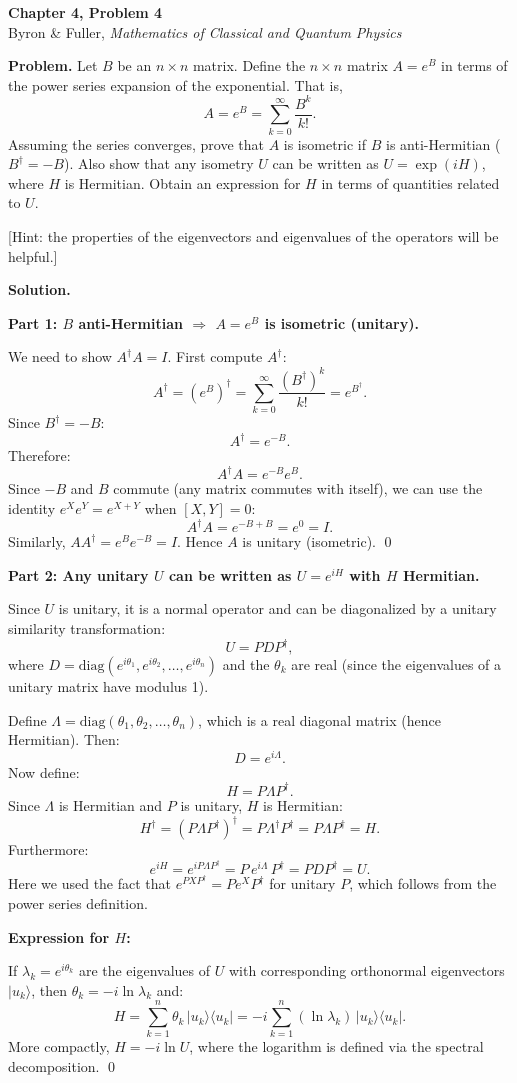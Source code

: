 \documentclass[12pt]{article}
\begin{document}
\begin{center}
{\Large\bfseries Chapter 4, Problem 4}\\[6pt]
Byron \& Fuller, \textit{Mathematics of Classical and Quantum Physics}
\end{center}

\bigskip

\textbf{Problem.} Let $B$ be an $n \times n$ matrix. Define the $n \times n$ matrix $A = e^B$ in terms of the power series expansion of the exponential. That is,
\[
A = e^B = \sum_{k=0}^{\infty} \frac{B^k}{k!}.
\]
Assuming the series converges, prove that $A$ is isometric if $B$ is anti-Hermitian ($B^\dagger = -B$). Also show that any isometry $U$ can be written as $U = \exp(iH)$, where $H$ is Hermitian. Obtain an expression for $H$ in terms of quantities related to $U$.

[Hint: the properties of the eigenvectors and eigenvalues of the operators will be helpful.]

\bigskip
\textbf{Solution.}

\textbf{Part 1: $B$ anti-Hermitian $\Rightarrow$ $A = e^B$ is isometric (unitary).}

We need to show $A^\dagger A = I$. First compute $A^\dagger$:
\[
A^\dagger = \left(e^B\right)^\dagger = \sum_{k=0}^{\infty} \frac{(B^\dagger)^k}{k!} = e^{B^\dagger}.
\]
Since $B^\dagger = -B$:
\[
A^\dagger = e^{-B}.
\]
Therefore:
\[
A^\dagger A = e^{-B} e^{B}.
\]
Since $-B$ and $B$ commute (any matrix commutes with itself), we can use the identity $e^X e^Y = e^{X+Y}$ when $[X,Y] = 0$:
\[
A^\dagger A = e^{-B+B} = e^0 = I.
\]
Similarly, $AA^\dagger = e^B e^{-B} = I$. Hence $A$ is unitary (isometric). \qed

\bigskip
\textbf{Part 2: Any unitary $U$ can be written as $U = e^{iH}$ with $H$ Hermitian.}

Since $U$ is unitary, it is a normal operator and can be diagonalized by a unitary similarity transformation:
\[
U = P D P^\dagger,
\]
where $D = \text{diag}(e^{i\theta_1}, e^{i\theta_2}, \ldots, e^{i\theta_n})$ and the $\theta_k$ are real (since the eigenvalues of a unitary matrix have modulus 1).

Define $\Lambda = \text{diag}(\theta_1, \theta_2, \ldots, \theta_n)$, which is a real diagonal matrix (hence Hermitian). Then:
\[
D = e^{i\Lambda}.
\]
Now define:
\[
H = P \Lambda P^\dagger.
\]
Since $\Lambda$ is Hermitian and $P$ is unitary, $H$ is Hermitian:
\[
H^\dagger = (P\Lambda P^\dagger)^\dagger = P \Lambda^\dagger P^\dagger = P \Lambda P^\dagger = H.
\]
Furthermore:
\[
e^{iH} = e^{iP\Lambda P^\dagger} = P\, e^{i\Lambda}\, P^\dagger = P D P^\dagger = U.
\]
Here we used the fact that $e^{P X P^\dagger} = P e^X P^\dagger$ for unitary $P$, which follows from the power series definition.

\bigskip
\textbf{Expression for $H$:}

If $\lambda_k = e^{i\theta_k}$ are the eigenvalues of $U$ with corresponding orthonormal eigenvectors $|u_k\rangle$, then $\theta_k = -i \ln \lambda_k$ and:
\[
H = \sum_{k=1}^n \theta_k\, |u_k\rangle\langle u_k| = -i \sum_{k=1}^n (\ln \lambda_k)\, |u_k\rangle\langle u_k|.
\]
More compactly, $H = -i \ln U$, where the logarithm is defined via the spectral decomposition. \qed
\end{document}
